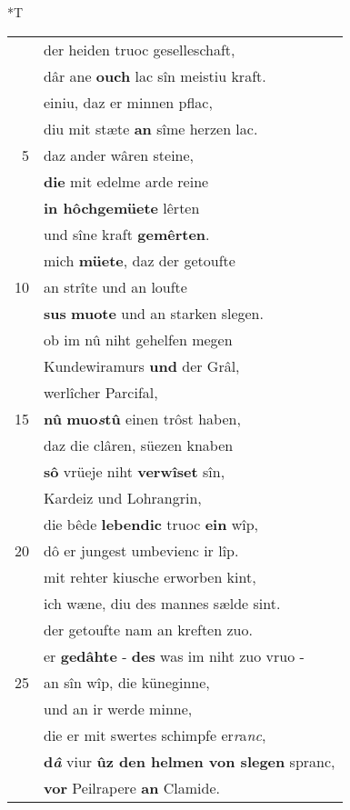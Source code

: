 \documentclass[8pt,a4paper,notitlepage]{article}
\begin{document}
\begin{table}[ht]
\begin{minipage}[t]{0.5\linewidth}
\small
\begin{center}*T
\end{center}
\begin{tabular}{rl}
 & der heiden truoc geselleschaft,\\ 
 & dâr ane \textbf{ouch} lac sîn meistiu kraft.\\ 
 & einiu, daz er minnen pflac,\\ 
 & diu mit stæte \textbf{an} sîme herzen lac.\\ 
5 & daz ander wâren steine,\\ 
 & \textbf{die} mit edelme arde reine\\ 
 & \textbf{in hôchgemüete} lêrten\\ 
 & und sîne kraft \textbf{gemêrten}.\\ 
 & mich \textbf{müete}, daz der getoufte\\ 
10 & an strîte und an loufte\\ 
 & \textbf{sus} \textbf{muote} und an starken slegen.\\ 
 & ob im nû niht gehelfen megen\\ 
 & Kundewiramurs \textbf{und} der Grâl,\\ 
 & werlîcher Parcifal,\\ 
15 & \textbf{nû} \textbf{muo\textit{s}tû} einen trôst haben,\\ 
 & daz die clâren, süezen knaben\\ 
 & \textbf{sô} vrüeje niht \textbf{verwîset} sîn,\\ 
 & Kardeiz und Lohrangrin,\\ 
 & die bêde \textbf{lebendic} truoc \textbf{ein} wîp,\\ 
20 & dô er jungest umbevienc ir lîp.\\ 
 & mit rehter kiusche erworben kint,\\ 
 & ich wæne, diu des mannes sælde sint.\\ 
 & der getoufte nam an kreften zuo.\\ 
 & er \textbf{gedâhte} - \textbf{des} was im niht zuo vruo -\\ 
25 & an sîn wîp, die küneginne,\\ 
 & und an ir werde minne,\\ 
 & die er mit swertes schimpfe er\textit{r}a\textit{nc},\\ 
 & \textbf{d\textit{â}} viur \textbf{ûz den helmen von slegen} spranc,\\ 
 & \textbf{vor} Peilrapere \textbf{an} Clamide.\\ 

\end{tabular}
\end{minipage}
\end{table}
\end{document}

